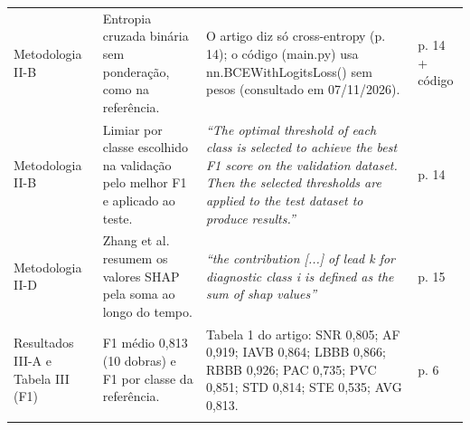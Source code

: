 \documentclass[11pt,a4paper]{article}
\begin{document}
\begin{longtable}{>{\raggedright\arraybackslash}p{2.6cm}>{\raggedright\arraybackslash}p{4.6cm}>{\raggedright\arraybackslash}p{7.6cm}>{\raggedright\arraybackslash}p{1.4cm}}
\addlinespace
Metodologia II-B & Entropia cruzada binária sem ponderação, como na referência. & O artigo diz só cross-entropy (p. 14); o código (main.py) usa nn.BCEWithLogitsLoss() sem pesos (consultado em 07/11/2026). & p. 14 + código \\
\addlinespace
Metodologia II-B & Limiar por classe escolhido na validação pelo melhor F1 e aplicado ao teste. & \textit{``The optimal threshold of each class is selected to achieve the best F1 score on the validation dataset. Then the selected thresholds are applied to the test dataset to produce results.''} & p. 14 \\
\addlinespace
Metodologia II-D & Zhang et al. resumem os valores SHAP pela soma ao longo do tempo. & \textit{``the contribution [...] of lead k for diagnostic class i is defined as the sum of shap values''} & p. 15 \\
\addlinespace
Resultados III-A e Tabela III (F1) & F1 médio 0,813 (10 dobras) e F1 por classe da referência. & Tabela 1 do artigo: SNR 0,805; AF 0,919; IAVB 0,864; LBBB 0,866; RBBB 0,926; PAC 0,735; PVC 0,851; STD 0,814; STE 0,535; AVG 0,813. & p. 6 \\
\addlinespace
\bottomrule
\end{longtable}
\end{document}
